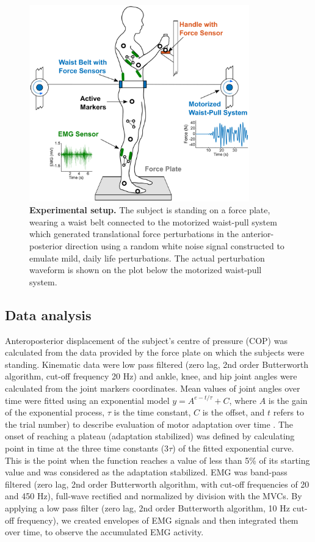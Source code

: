 \begin{figure}[htb!]
	\centering
	\includegraphics[width=0.85\textwidth]{Jernej/figures/expSetup}
	\caption{\textbf{Experimental setup. }The subject is standing on a force plate, wearing a waist belt connected to the motorized waist-pull system which generated translational force perturbations in the anterior-posterior direction using a random white noise signal constructed to emulate mild, daily life perturbations. The actual perturbation waveform is shown on the plot below the motorized waist-pull system.
			}
	\label{fig:methods}
\end{figure}

\subsection{Data analysis}  
Anteroposterior  displacement of the subject’s centre of pressure (COP) was calculated from the data provided by the force plate on which the subjects were standing. 
Kinematic data were low pass filtered (zero lag, 2nd order Butterworth algorithm, cut-off frequency 20 Hz) \cite{Bartlett1997} and ankle, knee, and hip joint angles were calculated from the joint markers coordinates. 
Mean values of joint angles over time were fitted using an exponential model $y = A^{e-t/\tau} + C$, where $A$ is the gain of the exponential process, $\tau$ is the time constant, $C$ is the offset, and $t$ refers to the trial number) to describe evaluation  of motor adaptation over time \cite{Franklin2003}. The onset of reaching a plateau (adaptation stabilized) was defined by calculating point in time at the three time constants (3$\tau$) of the fitted exponential curve. This is the point when the function reaches a value of less than 5\% of its starting value and was considered as the adaptation stabilized. 
EMG was band-pass filtered (zero lag, 2nd order Butterworth algorithm, with cut-off frequencies of 20 and 450 Hz), full-wave rectified and normalized by division with the MVCs.  By applying a low pass filter (zero lag, 2nd order Butterworth algorithm, 10 Hz cut-off frequency), we created envelopes of EMG signals and then integrated them over time, to observe the accumulated EMG activity.
